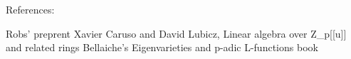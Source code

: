 References:

Robs' preprent
Xavier Caruso and David Lubicz, Linear algebra over Z_p[[u]] and related rings
Bellaiche's  Eigenvarieties and p-adic L-functions book
